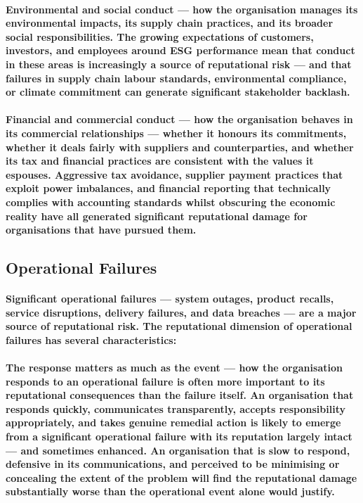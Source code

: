 \paragraph{\textbf{Environmental and social conduct} — how the organisation manages its environmental impacts, its supply chain practices, and its broader social responsibilities. The growing expectations of customers, investors, and employees around ESG performance mean that conduct in these areas is increasingly a source of reputational risk — and that failures in supply chain labour standards, environmental compliance, or climate commitment can generate significant stakeholder backlash.}
\paragraph{\textbf{Financial and commercial conduct} — how the organisation behaves in its commercial relationships — whether it honours its commitments, whether it deals fairly with suppliers and counterparties, and whether its tax and financial practices are consistent with the values it espouses. Aggressive tax avoidance, supplier payment practices that exploit power imbalances, and financial reporting that technically complies with accounting standards whilst obscuring the economic reality have all generated significant reputational damage for organisations that have pursued them.}

\subsection{Operational Failures}
\paragraph{Significant operational failures — system outages, product recalls, service disruptions, delivery failures, and data breaches — are a major source of reputational risk. The reputational dimension of operational failures has several characteristics:}
\paragraph{\textbf{The response matters as much as the event} — how the organisation responds to an operational failure is often more important to its reputational consequences than the failure itself. An organisation that responds quickly, communicates transparently, accepts responsibility appropriately, and takes genuine remedial action is likely to emerge from a significant operational failure with its reputation largely intact — and sometimes enhanced. An organisation that is slow to respond, defensive in its communications, and perceived to be minimising or concealing the extent of the problem will find the reputational damage substantially worse than the operational event alone would justify.}
